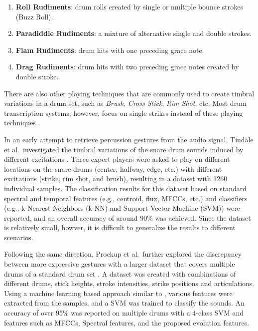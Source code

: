 \documentclass{article}
\begin{document}
\begin{enumerate}
	\item \textbf{Roll Rudiments}: drum rolls created by single or multiple bounce strokes (Buzz Roll).
	\item \textbf{Paradiddle Rudiments}: a mixture of alternative single and double strokes. 
	\item \textbf{Flam Rudiments}: drum hits with one preceding grace note.
	\item \textbf{Drag Rudiments}: drum hits with two preceding grace notes created by double stroke.
\end{enumerate}

There are also other playing techniques that are commonly used to create timbral variations in a drum set, such as \textit{Brush}, \textit{Cross Stick}, \textit{Rim Shot}, etc. Most drum transcription systems, however, focus on single strikes instead of these playing techniques \cite{Benetos2014, Dittmar2014, Thompson2014, Roebel2015, Wu2015a}. 

In an early attempt to retrieve percussion gestures from the audio signal, Tindale et al.~investigated the timbral variations of the snare drum sounds induced by different excitations \cite{Tindale2004}. Three expert players were asked to play on different locations on the snare drums (center, halfway, edge, etc.) with different excitations (strike, rim shot, and brush), resulting in a dataset with 1260 individual samples. The classification results for this dataset based on standard spectral and temporal features (e.g., centroid, flux, MFCCs, etc.) and classifiers (e.g., k-Nearest Neighbors (k-NN) and Support Vector Machine (SVM)) were reported, and an overall accuracy of around 90\% was achieved. Since the dataset is relatively small, howver, it is difficult to generalize the results to different scenarios.  

Following the same direction, Prockup et al.~further explored the discrepancy between more expressive gestures with a larger dataset that covers multiple drums of a standard drum set \cite{Prockup2013}. A dataset was created with combinations of different drums, stick heights, stroke intensities, strike positions and articulations. Using a machine learning based approach similar to \cite{Tindale2004}, various features were extracted from the samples, and a SVM was trained to classify the sounds. An accuracy of over 95\% was reported on multiple drums with a 4-class SVM and features such as MFCCs, Spectral features, and the proposed evolution features. 
\end{document}
